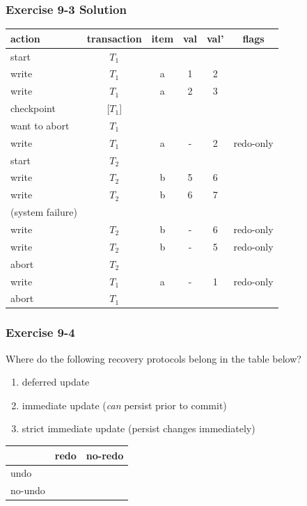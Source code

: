 \begin{frame}
\frametitle{Exercise 9-3 Solution}

\begin{center}
\begin{tabular}{ | l | c c c c | c | }
  \hline
  action & transaction & item & val & val' & flags \\
  \hline
  start & $T_1$ &   &   &   &           \\
  write & $T_1$ & a & 1 & 2 &           \\
  write & $T_1$ & a & 2 & 3 &           \\
  checkpoint & [$T_1$] &   &   &   &           \\
  want to abort & $T_1$ &   &   &   &           \\
  write & $T_1$ & a & - & 2 & redo-only \\
  start & $T_2$ &   &   &   &           \\
  write & $T_2$ & b & 5 & 6 &           \\
  write & $T_2$ & b & 6 & 7 &           \\
  (system failure) &       &   &   &   &           \\
  \hline
  write & $T_2$ & b & - & 6 & redo-only \\
  write & $T_2$ & b & - & 5 & redo-only \\
  abort & $T_2$ &   &   &   &           \\
  write & $T_1$ & a & - & 1 & redo-only \\
  abort & $T_1$ &   &   &   &           \\
  \hline
\end{tabular}
\end{center}

\end{frame}


\begin{frame}
\frametitle{Exercise 9-4}

Where do the following recovery protocols belong in the table below?

\begin{enumerate}
  \item deferred update
  \item immediate update (\textit{can} persist prior to commit)
  \item strict immediate update (persist changes immediately)
\end{enumerate}

\begin{center}
\begin{tabular}{ | l | c | c | }
  \hline
          & redo & no-redo \\
  \hline
  undo    &      &         \\
  \hline
  no-undo &      &         \\
  \hline
\end{tabular}
\end{center}

\end{frame}


